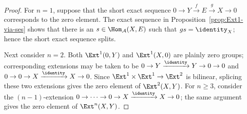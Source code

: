 \begin{proof}
	For $n=1$, suppose that the short exact sequence
	$0\to Y\xrightarrow{f}E\xrightarrow{g}X\to0$ corresponds to the zero
	element. The exact sequence in Proposition~\ref{prop:Ext1-via-ses}
	shows that there is an $s\in\Hom_{\mathcal{A}}(X,E)$ such that
	$gs=\identity_X$; hence the short exact sequence splits.

	Next consider $n=2$. Both $\Ext^1(0,Y)$ and $\Ext^1(X,0)$ are plainly
	zero groups; corresponding extensions may be taken to be
	$0\to Y\xrightarrow{\identity}Y\to0\to0$ and
	$0\to0\to X\xrightarrow{\identity}X\to0$. Since
	$\Ext^1\times\Ext^1\to\Ext^2$ is bilinear, splicing these two
	extensions gives the zero element of $\Ext^2(X,Y)$. For $n\geq3$,
	consider the $(n-1)$-extension
	$0\to\cdots\to0\to X\xrightarrow{\identity}X\to0$; the same argument
	gives the zero element of $\Ext^n(X,Y)$.
\end{proof}
